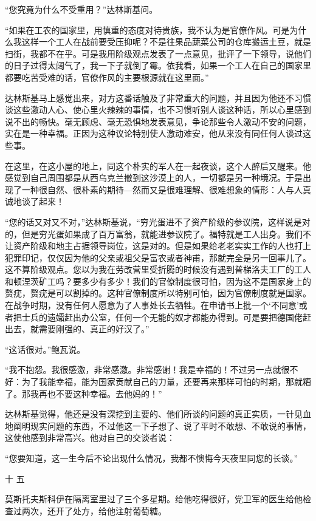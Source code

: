 “您究竟为什么不受重用？”达林斯基问。

“如果在工农的国家里，用慎重的态度对待贵族，我不认为是官僚作风。可是为什么我这样一个工人在战前要受压抑呢？不是往果品蔬菜公司的仓库搬运土豆，就是扫街，我都不在乎。可是我用阶级观点发表了一点意见，批评了一下领导，说他们的日子过得太阔气了，我一下子就倒了霉。依我看，如果一个工人在自己的国家里都要吃苦受难的话，官僚作风的主要根源就在这里面。”

达林斯基马上感觉出来，对方这番话触及了非常重大的问题，并且因为他还不习惯谈这些激动人心、使心里火辣辣的事情，也不习惯听别人谈这种话，所以心里感到说不出的畅快。毫无顾虑、毫无恐惧地发表意见，争论那些令人激动不安的问题，实在是一种幸福。正因为这种议论特别使人激动难安，他从来没有同任何人谈过这些事。

在这里，在这小屋的地上，同这个朴实的军人在一起夜谈，这个人醉后又醒来。他感觉到自己周围都是从西乌克兰撤到这沙漠上的人，一切都是另一种境况。于是出现了一种很自然、很朴素的期待—然而又是很难理解、很难想象的情形：人与人真诚地谈了起来！

“您的话又对又不对，”达林斯基说，“穷光蛋进不了资产阶级的参议院，这样说是对的，但是穷光蛋如果成了百万富翁，就能进参议院了。福特就是工人出身。我们不让资产阶级和地主占据领导岗位，这是对的。但是如果给老老实实工作的人也打上犯罪印记，仅仅因为他的父亲或祖父是富农或者神甫，那就完全是另一回事儿了。这不算阶级观点。您以为我在劳改营里受折腾的时候没有遇到普梯洛夫工厂的工人和顿涅茨矿工吗？要多少有多少！我们的官僚制度很可怕，因为这不是国家身上的赘疣，赘疣是可以割掉的。这种官僚制度所以特别可怕，因为官僚制度就是国家。在战争时期，没有任何人愿意为了人事处长去牺牲。在申请书上批一个‘不同意’或者把士兵的遗孀赶出办公室，任何一个无能的奴才都能办得到。可是要把德国佬赶出去，就需要刚强的、真正的好汉了。”

“这话很对。”鲍瓦说。

“我不抱怨。我很感激，非常感激。非常感谢！我是幸福的！不过另一点就很不好：为了我能幸福，能为国家贡献自己的力量，还要再来那样可怕的时期，那就糟了。那我再也不要这种幸福。去他妈的！”

达林斯基觉得，他还是没有深挖到主要的、他们所谈的问题的真正实质，一针见血地阐明现实问题的东西，不过他这一下子想了、说了平时不敢想、不敢说的事情，这使他感到非常高兴。他对自己的交谈者说：

“您要知道，这一生今后不论出现什么情况，我都不懊悔今天夜里同您的长谈。”

十 五

莫斯托夫斯科伊在隔离室里过了三个多星期。给他吃得很好，党卫军的医生给他检查过两次，还开了处方，给他注射葡萄糖。

